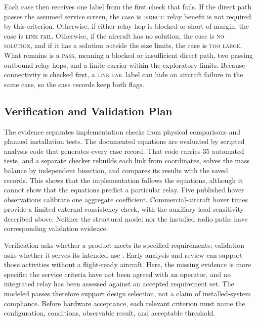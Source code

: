 \documentclass[twocolumn,letterpaper]{IEEEAerospaceCLS}
\begin{document}
Each case then receives one label from the first check that fails. If the direct path passes the assumed service screen, the case is \textsc{direct}: relay benefit is not required by this criterion. Otherwise, if either relay hop is blocked or short of margin, the case is \textsc{link fail}. Otherwise, if the aircraft has no solution, the case is \textsc{no solution}, and if it has a solution outside the size limits, the case is \textsc{too large}. What remains is a \textsc{pass}, meaning a blocked or insufficient direct path, two passing outbound relay hops, and a finite carrier within the exploratory limits. Because connectivity is checked first, a \textsc{link fail} label can hide an aircraft failure in the same case, so the case records keep both flags.

\subsection{Verification and Validation Plan}

The evidence separates implementation checks from physical comparisons and planned installation tests. The documented equations are evaluated by scripted analysis code that generates every case record. That code carries 35 automated tests, and a separate checker rebuilds each link from coordinates, solves the mass balance by independent bisection, and compares its results with the saved records. This shows that the implementation follows the equations, although it cannot show that the equations predict a particular relay. Five published hover observations calibrate one aggregate coefficient. Commercial-aircraft hover times provide a limited external consistency check, with the auxiliary-load sensitivity described above. Neither the structural model nor the installed radio paths have corresponding validation evidence.

Verification asks whether a product meets its specified requirements; validation asks whether it serves its intended use \cite{nasaSEH}. Early analysis and review can support those activities without a flight-ready aircraft. Here, the missing evidence is more specific: the service criteria have not been agreed with an operator, and no integrated relay has been assessed against an accepted requirement set. The modeled passes therefore support design selection, not a claim of installed-system compliance. Before hardware acceptance, each relevant criterion must name the configuration, conditions, observable result, and acceptable threshold.
\end{document}

